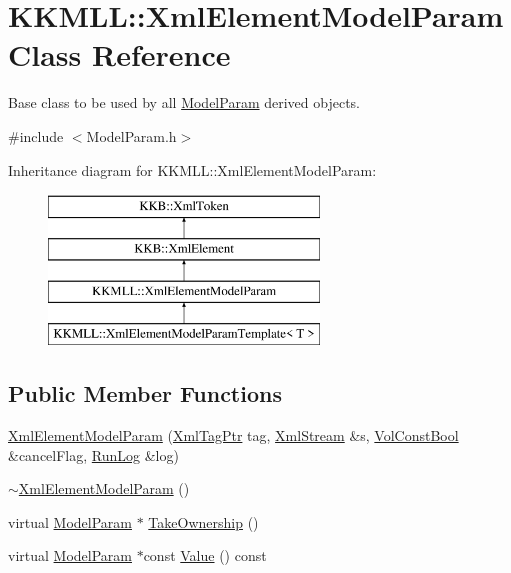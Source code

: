 \hypertarget{class_k_k_m_l_l_1_1_xml_element_model_param}{}\section{K\+K\+M\+LL\+:\+:Xml\+Element\+Model\+Param Class Reference}
\label{class_k_k_m_l_l_1_1_xml_element_model_param}


Base class to be used by all \hyperlink{class_k_k_m_l_l_1_1_model_param}{Model\+Param} derived objects.  




{\ttfamily \#include $<$Model\+Param.\+h$>$}

Inheritance diagram for K\+K\+M\+LL\+:\+:Xml\+Element\+Model\+Param\+:\begin{figure}[H]
\begin{center}
\leavevmode
\includegraphics[height=4.000000cm]{class_k_k_m_l_l_1_1_xml_element_model_param}
\end{center}
\end{figure}
\subsection*{Public Member Functions}
\begin{DoxyCompactItemize}
\item 
\hyperlink{class_k_k_m_l_l_1_1_xml_element_model_param_a105bb622471e4dea27faedb81427e194}{Xml\+Element\+Model\+Param} (\hyperlink{namespace_k_k_b_a9253a3ea8a5da18ca82be4ca2b390ef0}{Xml\+Tag\+Ptr} tag, \hyperlink{class_k_k_b_1_1_xml_stream}{Xml\+Stream} \&s, \hyperlink{namespace_k_k_b_a7d390f568e2831fb76b86b56c87bf92f}{Vol\+Const\+Bool} \&cancel\+Flag, \hyperlink{class_k_k_b_1_1_run_log}{Run\+Log} \&log)
\item 
\hyperlink{class_k_k_m_l_l_1_1_xml_element_model_param_a362a4e06099876e6734303d244cff5e8}{$\sim$\+Xml\+Element\+Model\+Param} ()
\item 
virtual \hyperlink{class_k_k_m_l_l_1_1_model_param}{Model\+Param} $\ast$ \hyperlink{class_k_k_m_l_l_1_1_xml_element_model_param_adea7f8baf74a48f181962fa32041c64a}{Take\+Ownership} ()
\item 
virtual \hyperlink{class_k_k_m_l_l_1_1_model_param}{Model\+Param} $\ast$const \hyperlink{class_k_k_m_l_l_1_1_xml_element_model_param_a133eb97a0b83836127d906917c980052}{Value} () const 
\end{DoxyCompactItemize}
